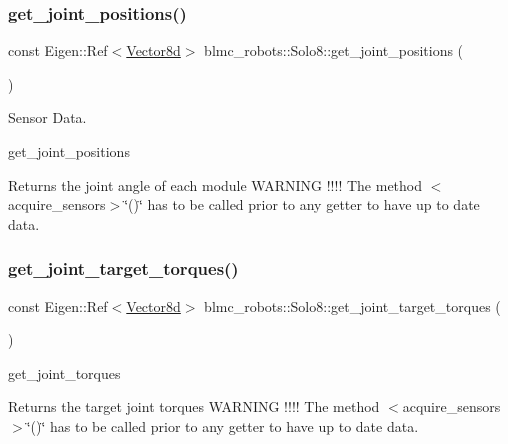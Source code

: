 \subsubsection{\texorpdfstring{get\+\_\+joint\+\_\+positions()}{get\_joint\_positions()}}
{\footnotesize\ttfamily const Eigen\+::\+Ref$<$\hyperlink{common__header_8hpp_a98975ffbe0bca1296078e0350dfedd60}{Vector8d}$>$ blmc\+\_\+robots\+::\+Solo8\+::get\+\_\+joint\+\_\+positions (\begin{DoxyParamCaption}{ }\end{DoxyParamCaption})\hspace{0.3cm}{\ttfamily [inline]}}



Sensor Data. 

get\+\_\+joint\+\_\+positions \begin{DoxyReturn}{Returns}
the joint angle of each module W\+A\+R\+N\+I\+NG !!!! The method $<$acquire\+\_\+sensors$>$\char`\"{}()\char`\"{} has to be called prior to any getter to have up to date data. 
\end{DoxyReturn}
\mbox{\label{classblmc__robots_1_1Solo8_ac18587cbf727c3da1432f1baea9c7e2a}} 
\subsubsection{\texorpdfstring{get\+\_\+joint\+\_\+target\+\_\+torques()}{get\_joint\_target\_torques()}}
{\footnotesize\ttfamily const Eigen\+::\+Ref$<$\hyperlink{common__header_8hpp_a98975ffbe0bca1296078e0350dfedd60}{Vector8d}$>$ blmc\+\_\+robots\+::\+Solo8\+::get\+\_\+joint\+\_\+target\+\_\+torques (\begin{DoxyParamCaption}{ }\end{DoxyParamCaption})\hspace{0.3cm}{\ttfamily [inline]}}



get\+\_\+joint\+\_\+torques 

\begin{DoxyReturn}{Returns}
the target joint torques W\+A\+R\+N\+I\+NG !!!! The method $<$acquire\+\_\+sensors$>$\char`\"{}()\char`\"{} has to be called prior to any getter to have up to date data. 
\end{DoxyReturn}
\mbox{\label{classblmc__robots_1_1Solo8_a31b0684570b478967034513a4ade8031}} 
